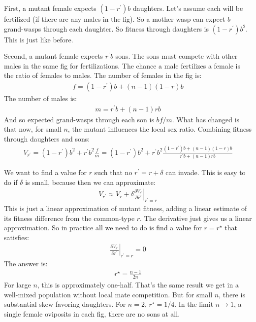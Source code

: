 \documentclass[10pt,reqno]{amsbook}
\numberwithin{equation}{chapter}
\begin{document}
First, a mutant female expects $(1-r^\prime)b$ daughters. Let's assume each will be fertilized (if there are any males in the fig). So a mother wasp can expect $b$ grand-wasps through each daughter. So fitness through daughters is $(1-r^\prime)b^2$. This is just like before.

Second, a mutant female expects $r^\prime b$ sons. The sons must compete with other males in the same fig for fertilizations. The chance a male fertilizes a female is the ratio of females to males. The number of females in the fig is:
\begin{align*}
	f = (1-r^\prime)b + (n-1)(1-r)b
\end{align*}
The number of males is:
\begin{align*}
	m = r^\prime b + (n-1)rb
\end{align*}
And so expected grand-wasps through each son is $b f/m$. What has changed is that now, for small $n$, the mutant influences the local sex ratio. 
Combining fitness through daughters and sons:
\begin{align*}
	V_{r^\prime} = (1-r^\prime)b^2 + r^\prime b^2 \frac{f}{m} = (1-r^\prime)b^2 + r^\prime b^2 \frac{ (1-r^\prime)b + (n-1)(1-r)b }{ r^\prime b + (n-1)rb }
\end{align*}

We want to find a value for $r$ such that no $r^\prime = r + \delta$ can invade. This is easy to do if $\delta$ is small, because then we can approximate:
\begin{align*}
	V_{r^\prime} \approx V_{r} + \delta \left.\frac{\partial V_{r^\prime} }{\partial r^\prime} \right|_{r^\prime = r}
\end{align*}
This is just a linear approximation of mutant fitness, adding a linear estimate of its fitness difference from the common-type $r$. The derivative just gives us a linear approximation. So in practice all we need to do is find a value for $r = r^\star$ that satisfies:
\begin{align*}
	\left.\frac{\partial V_{r^\prime} }{\partial r^\prime} \right|_{r^\prime = r} = 0
\end{align*}
The answer is:
\begin{align*}
	r^\star = \frac{n-1}{2n}
\end{align*}
For large $n$, this is approximately one-half. That's the same result we get in a well-mixed population without local mate competition. But for small $n$, there is substantial skew favoring daughters. For $n=2$, $r^\star = 1/4$. In the limit $n \rightarrow 1$, a single female oviposits in each fig, there are no sons at all.
\end{document}
